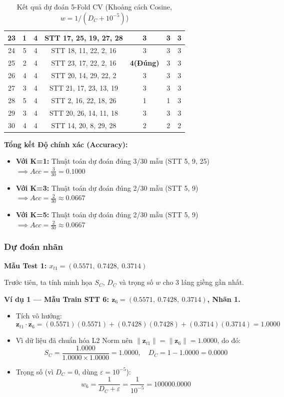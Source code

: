 \documentclass[12pt,a4paper]{article}
\begin{document}
\begin{table}[H]
\begin{tabular}{|c|c|c|c|c|c|c|}
23 & 1 & 4 & STT 17, 25, 19, 27, 28 & 3 & 3 & 3 \\ \hline
24 & 5 & 4 & STT 18, 11, 22, 2, 16 & 3 & 3 & 3 \\ \hline
25 & 2 & 4 & STT 23, 17, 22, 2, 16 & \textbf{4(Đúng)} & 3 & 3 \\ \hline
26 & 4 & 4 & STT 20, 14, 29, 22, 2 & 3 & 3 & 3 \\ \hline
27 & 3 & 4 & STT 21, 17, 23, 13, 19 & 3 & 3 & 3 \\ \hline
28 & 5 & 4 & STT 2, 16, 22, 18, 26 & 1 & 1 & 3 \\ \hline
29 & 3 & 4 & STT 20, 26, 14, 11, 18 & 3 & 3 & 3 \\ \hline
30 & 4 & 4 & STT 14, 20, 8, 29, 28 & 2 & 2 & 2 \\ \hline
\end{tabular}
\caption{Kết quả dự đoán 5-Fold CV (Khoảng cách Cosine, $w = 1/(D_C + 10^{-5})$)}
\end{table}

\textbf{Tổng kết Độ chính xác (Accuracy):}
\begin{itemize}
    \item \textbf{Với K=1:} Thuật toán dự đoán đúng 3/30 mẫu (STT 5, 9, 25) $\implies Acc = \frac{3}{30} = 0.1000$
    \item \textbf{Với K=3:} Thuật toán dự đoán đúng 2/30 mẫu (STT 5, 9) $\implies Acc = \frac{2}{30} \approx 0.0667$
    \item \textbf{Với K=5:} Thuật toán dự đoán đúng 2/30 mẫu (STT 5, 9) $\implies Acc = \frac{2}{30} \approx 0.0667$
\end{itemize}
\subsubsection{Dự đoán nhãn}
\textbf{Mẫu Test 1: $x_{t1} = (0.5571,\ 0.7428,\ 0.3714)$}
 
\vspace{0.3cm}
Trước tiên, ta tính minh họa $S_C$, $D_C$ và trọng số $w$ cho 3 láng giềng gần nhất.
 
\vspace{0.3cm}
\textbf{Ví dụ 1 — Mẫu Train STT 6: $\mathbf{z}_6 = (0.5571,\ 0.7428,\ 0.3714)$, Nhãn 1.}
\begin{itemize}
    \item Tích vô hướng:
    \[
        \mathbf{z}_{t1} \cdot \mathbf{z}_6
        = (0.5571)(0.5571) + (0.7428)(0.7428) + (0.3714)(0.3714) = 1.0000
    \]
    \item Vì dữ liệu đã chuẩn hóa L2 Norm nên $\|\mathbf{z}_{t1}\| = \|\mathbf{z}_6\| = 1.0000$, do đó:
    \[
        S_C = \frac{1.0000}{1.0000 \times 1.0000} = 1.0000, \quad
        D_C = 1 - 1.0000 = 0.0000
    \]
    \item Trọng số (vì $D_C = 0$, dùng $\varepsilon = 10^{-5}$):
    \[
        w_6 = \frac{1}{D_C + \varepsilon} = \frac{1}{10^{-5}} = 100000.0000
    \]
\end{itemize}
 
\end{document}
